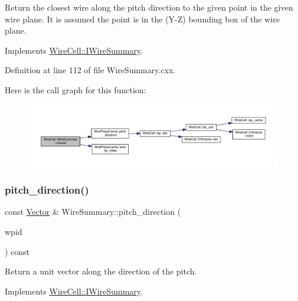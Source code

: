 Return the closest wire along the pitch direction to the given point in the given wire plane. It is assumed the point is in the (Y-\/Z) bounding box of the wire plane. 

Implements \hyperlink{class_wire_cell_1_1_i_wire_summary_aa3c27c8c001bfacb7b1eb55dc586fb9f}{Wire\+Cell\+::\+I\+Wire\+Summary}.



Definition at line 112 of file Wire\+Summary.\+cxx.

Here is the call graph for this function\+:
\nopagebreak
\begin{figure}[H]
\begin{center}
\leavevmode
\includegraphics[width=350pt]{class_wire_cell_1_1_wire_summary_ad5b6996523e8d8a98fd0caec607fd9ad_cgraph}
\end{center}
\end{figure}
\mbox{\label{class_wire_cell_1_1_wire_summary_a0b38146487504f384c0a619db67f6e4a}} 
\subsubsection{\texorpdfstring{pitch\+\_\+direction()}{pitch\_direction()}}
{\footnotesize\ttfamily const \hyperlink{namespace_wire_cell_aa3c82d3ba85f032b0d278b7004846800}{Vector} \& Wire\+Summary\+::pitch\+\_\+direction (\begin{DoxyParamCaption}\item[{\hyperlink{class_wire_cell_1_1_wire_plane_id}{Wire\+Plane\+Id}}]{wpid }\end{DoxyParamCaption}) const\hspace{0.3cm}{\ttfamily [virtual]}}



Return a unit vector along the direction of the pitch. 



Implements \hyperlink{class_wire_cell_1_1_i_wire_summary_a7ed1cb880286717c269fa4fb9fcceec9}{Wire\+Cell\+::\+I\+Wire\+Summary}.



